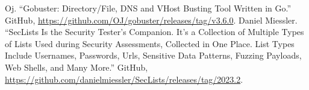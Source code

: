 \documentclass[conference]{IEEEtran}
\begin{document}
\begin{thebibliography}{00}

 Oj. “Gobuster: Directory/File, DNS and VHost Busting Tool Written in Go.” GitHub, \url{https://github.com/OJ/gobuster/releases/tag/v3.6.0}.
 Daniel Miessler. “SecLists Is the Security Tester’s Companion. It’s a Collection of Multiple Types of Lists Used during Security Assessments, Collected in One Place. List Types Include Usernames, Passwords, Urls, Sensitive Data Patterns, Fuzzing Payloads, Web Shells, and Many More.” GitHub, \url{https://github.com/danielmiessler/SecLists/releases/tag/2023.2}.

\end{thebibliography}
\vspace{12pt}
\end{document}
